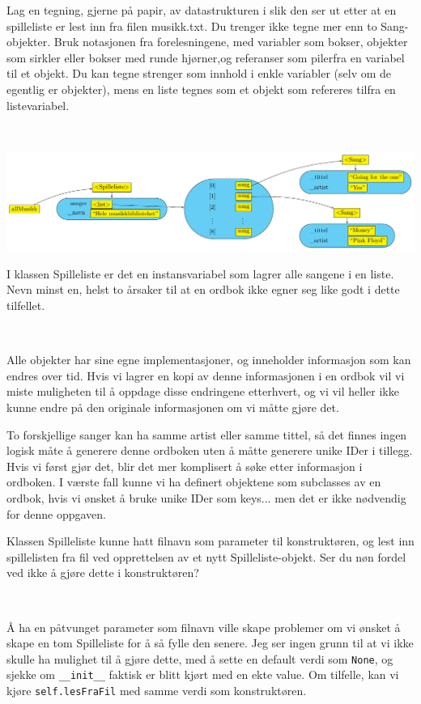 \documentclass{myassignment}
\begin{document}
	\begin{problem}
		Lag en tegning, gjerne på papir, av datastrukturen i slik den ser ut etter at en spilleliste er lest inn fra filen musikk.txt. Du trenger ikke tegne mer enn to Sang-objekter. Bruk notasjonen fra forelesningene, med variabler som bokser, objekter som sirkler eller bokser med runde hjørner,og referanser som pilerfra en variabel til et objekt. Du kan tegne strenger som innhold i enkle variabler (selv om de egentlig er objekter), mens en liste tegnes som et objekt som refereres tilfra en listevariabel.
	\end{problem}\\
	\begin{answer}
		\includegraphics[width=\textwidth]{classstructure.pdf}
	\end{answer}

	\begin{problem}
		I klassen Spilleliste er det en instansvariabel som lagrer alle sangene i en liste. Nevn minst en, helst to årsaker til at en ordbok ikke egner seg like godt i dette tilfellet.
	\end{problem}\\
	\begin{answer}
		Alle objekter har sine egne implementasjoner, og inneholder informasjon som kan endres over tid. Hvis vi lagrer en kopi av denne informasjonen i en ordbok vil vi miste muligheten til å oppdage disse endringene etterhvert, og vi vil heller ikke kunne endre på den originale informasjonen om vi måtte gjøre det. 

		To forskjellige sanger kan ha samme artist eller samme tittel, så det finnes ingen logisk måte å generere denne ordboken uten å måtte generere unike IDer i tillegg. Hvis vi først gjør det, blir det mer komplisert å søke etter informasjon i ordboken. I værste fall kunne vi ha definert objektene som subclasses av en ordbok, hvis vi ønsket å bruke unike IDer som keys... men det er ikke nødvendig for denne oppgaven.
	\end{answer}

	\begin{problem}
		Klassen Spilleliste kunne hatt filnavn som parameter til konstruktøren, og lest inn spillelisten fra fil ved opprettelsen av et nytt Spilleliste-objekt. Ser du nøn fordel ved ikke å gjøre dette i konstruktøren?
	\end{problem}\\
	\begin{answer}
		Å ha en påtvunget parameter som filnavn ville skape problemer om vi ønsket å skape en tom Spilleliste for å så fylle den senere. Jeg ser ingen grunn til at vi ikke skulle ha mulighet til å gjøre dette, med å sette en default verdi som \texttt{None}, og sjekke om \texttt{\_\_init\_\_} faktisk er blitt kjørt med en ekte value. Om tilfelle, kan vi kjøre \texttt{self.lesFraFil} med samme verdi som konstruktøren.
	\end{answer}
\end{document}

